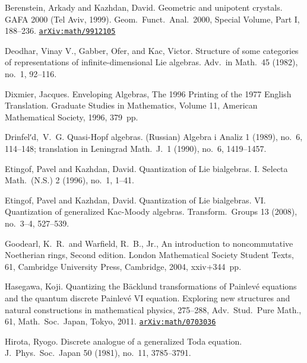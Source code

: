 \documentclass[12pt,twoside]{article}
\newcommand\arxivref[1]{\href{http://arxiv.org/abs/#1}{\tt arXiv:#1}}
\theoremstyle{plain} %
\theoremstyle{definition} %
\theoremstyle{definition} %
\numberwithin{theorem}{section}
\numberwithin{equation}{section}
\numberwithin{figure}{section}
\numberwithin{table}{section}
\begin{document}
\begin{thebibliography}{99}

Berenstein, Arkady and Kazhdan, David. 
Geometric and unipotent crystals. 
GAFA 2000 (Tel Aviv, 1999). 
Geom.\ Funct.\ Anal.\ 2000, Special Volume, Part I, 188--236.
\arxivref{math/9912105}


Deodhar, Vinay V., Gabber, Ofer, and Kac, Victor. 
Structure of some categories of representations 
of infinite-dimensional Lie algebras. 
Adv.\ in Math.\ 45 (1982), no.~1, 92--116.

Dixmier, Jacques.
Enveloping Algebras,
The 1996 Printing of the 1977 English Translation.
Graduate Studies in Mathematics, Volume 11, 
American Mathematical Society, 1996, 379~pp.

Drinfelʹd,~V.~G. 
Quasi-Hopf algebras. 
(Russian) Algebra i Analiz 1 (1989), no.~6, 114--148; 
translation in Leningrad Math.\ J.\ 1 (1990), no.~6, 1419--1457.

Etingof, Pavel and Kazhdan, David. 
Quantization of Lie bialgebras. I. 
Selecta Math.\ (N.S.) 2 (1996), no.~1, 1--41.

Etingof, Pavel and Kazhdan, David. 
Quantization of Lie bialgebras. 
VI. Quantization of generalized Kac-Moody algebras. 
Transform.\ Groups 13 (2008), no.~3--4, 527--539. 

Goodearl, K.~R.\ and Warfield, R.~B., Jr.,
An introduction to noncommutative Noetherian rings, Second edition.
London Mathematical Society Student Texts, 61, 
Cambridge University Press, Cambridge, 2004, xxiv+344~pp. 

Hasegawa, Koji. 
Quantizing the B\"acklund transformations of Painlev\'e equations 
and the quantum discrete Painlev\'e VI equation. 
Exploring new structures and natural constructions in mathematical physics, 275--288, 
Adv.\ Stud.\ Pure Math., 61, Math.\ Soc.\ Japan, Tokyo, 2011.
\arxivref{math/0703036}

Hirota, Ryogo.
Discrete analogue of a generalized Toda equation. 
J.\ Phys.\ Soc.\ Japan 50 (1981), no.~11, 3785--3791. 


\end{thebibliography}
\end{document}
